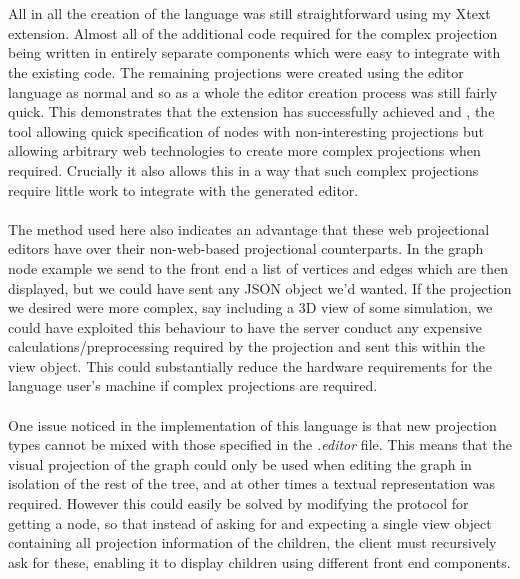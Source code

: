 \documentclass{article}
\begin{document}
\\
\\
All in all the creation of the language was still straightforward using my Xtext extension. Almost all of the additional code required for the complex projection being written in entirely separate components which were easy to integrate with the existing code. The remaining projections were created using the editor language as normal and so as a whole the editor creation process was still fairly quick. This demonstrates that the extension has successfully achieved \RSetup and \RCustom, the tool allowing quick specification of nodes with non-interesting projections but allowing arbitrary web technologies to create more complex projections when required. Crucially it also allows this in a way that such complex projections require little work to integrate with the generated editor. 
\\
\\
The method used here also indicates an advantage that these web projectional editors have over their non-web-based projectional counterparts. In the graph node example we send to the front end a list of vertices and edges which are then displayed, but we could have sent any JSON object we'd wanted. If the projection we desired were more complex, say including a 3D view of some simulation, we could have exploited this behaviour to have the server conduct any expensive calculations/preprocessing required by the projection and sent this within the view object. This could substantially reduce the hardware requirements for the language user's machine if complex projections are required.
\\
\\
One issue noticed in the implementation of this language is that new projection types cannot be mixed with those specified in the \emph{.editor} file. This means that the visual projection of the graph could only be used when editing the graph in isolation of the rest of the tree, and at other times a textual representation was required. However this could easily be solved by modifying the protocol for getting a node, so that instead of asking for and expecting a single view object containing all projection information of the children, the client must recursively ask for these, enabling it to display children using different front end components.
%
%
\end{document}

